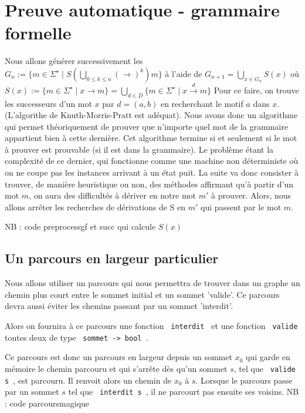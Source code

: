 \documentclass[a4paper,12pt]{article}
\begin{document}
\section{Preuve automatique - grammaire formelle}

Nous allons générer successivement les $G_n := \{m \in \Sigma^\star \mid S (\bigcup_{0 \leq k \leq n} (\rightarrow)^k) m\}$ à l'aide de $G_{n+1} = \bigcup_{x \in G_n} S(x)$ où $S(x) := \{m \in \Sigma^\star \mid x \rightarrow m \} = \bigcup_{d \in D} \{m \in \Sigma^\star \mid x \overset{d}{\rightarrow} m \}$
Pour ce faire, on trouve les successeurs d'un mot $x$ par $d = (a,b)$ en recherchant le motif $a$ dans $x$. (L'algorithe de Knuth-Morris-Pratt est adéquat). 
Nous avons donc un algorithme qui permet théoriquement de prouver que n'importe quel mot de la grammaire appartient bien à cette dernière.
Cet algorithme termine si et seulement si le mot à prouver est prouvable (si il est dans la grammaire).
Le problème étant la complexité de ce dernier, qui fonctionne comme une machine non déterministe où on ne coupe pas les instances arrivant à un état puit.
La suite va donc consister à trouver, de manière heuristique ou non, des méthodes affirmant qu'à partir d'un mot $m$, on aura des difficultés à dériver en notre mot $m'$ à prouver.
Alors, nous allons arrêter les recherches de dérivations de S en $m'$ qui passent par le mot $m$.

{\color{gray} NB : code preprocessgf et succ qui calcule $S(x)$}\\

\subsection{Un parcours en largeur particulier}
Nous allons utiliser un parcours qui nous permettra de trouver dans un graphe un chemin plus court entre le sommet initial et un sommet 'valide'.
Ce parcours devra aussi éviter les chemins passant par un sommet 'interdit'.

Alors on fournira à ce parcours une fonction \texttt{ interdit } et une fonction \texttt{ valide } toutes deux de type \texttt{ sommet -> bool }.

Ce parcours est donc un parcours en largeur depuis un sommet $x_0$ qui garde en mémoire le chemin parcouru et qui s'arrête dès qu'un 
sommet $s$, tel que \texttt{ valide s }, est parcouru. Il renvoit alors un chemin de $x_0$ à $s$. Lorsque le parcours passe par un sommet $s$ tel que \texttt{ interdit s }, 
il ne parcourt pas ensuite ses voisins.
{\color{gray} NB : code parcoursmagique}\\
\end{document}
